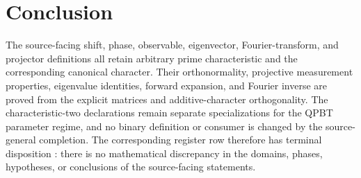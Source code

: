 \documentclass[11pt]{article}
\begin{document}
\section{Conclusion}
The source-facing shift, phase, observable, eigenvector, Fourier-transform, and
projector definitions all retain arbitrary prime characteristic and the
corresponding canonical character.  Their orthonormality, projective
measurement properties, eigenvalue identities, forward expansion, and Fourier
inverse are proved from the explicit matrices and additive-character
orthogonality.  The characteristic-two declarations remain separate
specializations for the QPBT parameter regime, and no binary definition or
consumer is changed by the source-general completion.  The corresponding
register row therefore has terminal disposition : there is
no mathematical discrepancy in the domains, phases, hypotheses, or conclusions
of the source-facing statements.


\end{document}
